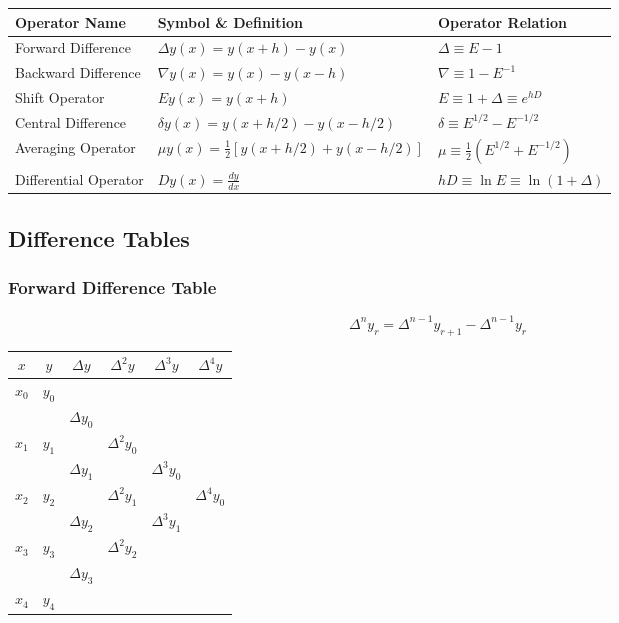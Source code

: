 \documentclass[11pt,a4paper]{article}
\begin{document}
\begin{center}
\begin{tabular}{lll}
    \toprule
    \textbf{Operator Name} & \textbf{Symbol \& Definition} & \textbf{Operator Relation} \\
    \midrule
    Forward Difference & $\Delta y(x) = y(x+h) - y(x)$ & $\Delta \equiv E - 1$ \\
    Backward Difference & $\nabla y(x) = y(x) - y(x-h)$ & $\nabla \equiv 1 - E^{-1}$ \\
    Shift Operator & $E y(x) = y(x+h)$ & $E \equiv 1 + \Delta \equiv e^{hD}$ \\
    Central Difference & $\delta y(x) = y(x + h/2) - y(x - h/2)$ & $\delta \equiv E^{1/2} - E^{-1/2}$ \\
    Averaging Operator & $\mu y(x) = \frac{1}{2}\left[y(x + h/2) + y(x - h/2)\right]$ & $\mu \equiv \frac{1}{2}(E^{1/2} + E^{-1/2})$ \\
    Differential Operator & $D y(x) = \frac{dy}{dx}$ & $hD \equiv \ln E \equiv \ln(1+\Delta)$ \\
    \bottomrule
\end{tabular}
\end{center}

\subsection{Difference Tables}
\subsubsection{Forward Difference Table}
$$\Delta^n y_r = \Delta^{n-1} y_{r+1} - \Delta^{n-1} y_r$$
\begin{center}
\begin{tabular}{cccccc}
    \toprule
    $x$ & $y$ & $\Delta y$ & $\Delta^2 y$ & $\Delta^3 y$ & $\Delta^4 y$ \\
    \midrule
    $x_0$ & $y_0$ & & & & \\
    & & $\Delta y_0$ & & & \\
    $x_1$ & $y_1$ & & $\Delta^2 y_0$ & & \\
    & & $\Delta y_1$ & & $\Delta^3 y_0$ & \\
    $x_2$ & $y_2$ & & $\Delta^2 y_1$ & & $\Delta^4 y_0$ \\
    & & $\Delta y_2$ & & $\Delta^3 y_1$ & \\
    $x_3$ & $y_3$ & & $\Delta^2 y_2$ & & \\
    & & $\Delta y_3$ & & & \\
    $x_4$ & $y_4$ & & & & \\
    \bottomrule
\end{tabular}
\end{center}
\end{document}
